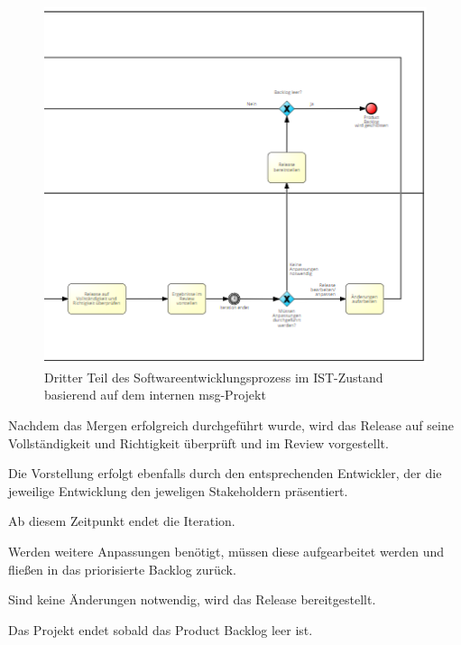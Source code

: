 \begin{figure}[h]
    \centering
    \includegraphics[scale=0.6]{Bilder/IST-Prozess_third Part.png}
    \caption{Dritter Teil des Softwareentwicklungsprozess im IST-Zustand basierend auf dem internen msg-Projekt}
\end{figure}

Nachdem das Mergen erfolgreich durchgeführt wurde, wird das Release auf seine Vollständigkeit und Richtigkeit überprüft und im Review vorgestellt. 

Die Vorstellung erfolgt ebenfalls durch den entsprechenden Entwickler, der die jeweilige Entwicklung den jeweligen Stakeholdern präsentiert. 

Ab diesem Zeitpunkt endet die Iteration. 

Werden weitere Anpassungen benötigt, müssen diese aufgearbeitet werden und fließen in das priorisierte Backlog zurück.

Sind keine Änderungen notwendig, wird das Release bereitgestellt. 

Das Projekt endet sobald das Product Backlog leer ist.




